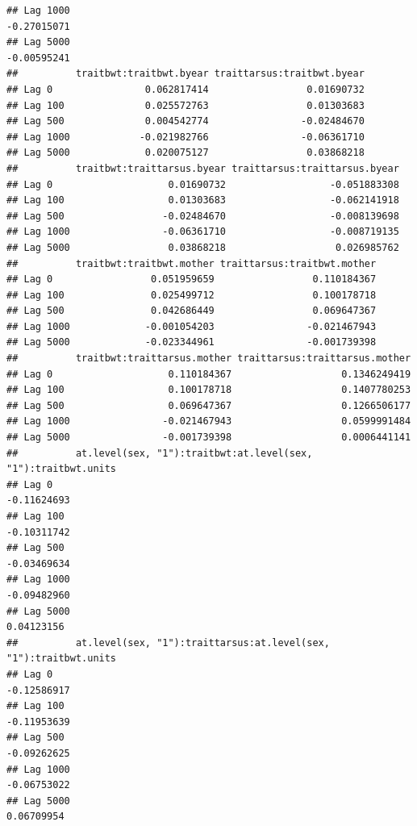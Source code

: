 \documentclass[
  12pt,
]{book}
\begin{document}
\begin{verbatim}
## Lag 1000                                                          -0.27015071
## Lag 5000                                                          -0.00595241
##          traitbwt:traitbwt.byear traittarsus:traitbwt.byear
## Lag 0                0.062817414                 0.01690732
## Lag 100              0.025572763                 0.01303683
## Lag 500              0.004542774                -0.02484670
## Lag 1000            -0.021982766                -0.06361710
## Lag 5000             0.020075127                 0.03868218
##          traitbwt:traittarsus.byear traittarsus:traittarsus.byear
## Lag 0                    0.01690732                  -0.051883308
## Lag 100                  0.01303683                  -0.062141918
## Lag 500                 -0.02484670                  -0.008139698
## Lag 1000                -0.06361710                  -0.008719135
## Lag 5000                 0.03868218                   0.026985762
##          traitbwt:traitbwt.mother traittarsus:traitbwt.mother
## Lag 0                 0.051959659                 0.110184367
## Lag 100               0.025499712                 0.100178718
## Lag 500               0.042686449                 0.069647367
## Lag 1000             -0.001054203                -0.021467943
## Lag 5000             -0.023344961                -0.001739398
##          traitbwt:traittarsus.mother traittarsus:traittarsus.mother
## Lag 0                    0.110184367                   0.1346249419
## Lag 100                  0.100178718                   0.1407780253
## Lag 500                  0.069647367                   0.1266506177
## Lag 1000                -0.021467943                   0.0599991484
## Lag 5000                -0.001739398                   0.0006441141
##          at.level(sex, "1"):traitbwt:at.level(sex, "1"):traitbwt.units
## Lag 0                                                      -0.11624693
## Lag 100                                                    -0.10311742
## Lag 500                                                    -0.03469634
## Lag 1000                                                   -0.09482960
## Lag 5000                                                    0.04123156
##          at.level(sex, "1"):traittarsus:at.level(sex, "1"):traitbwt.units
## Lag 0                                                         -0.12586917
## Lag 100                                                       -0.11953639
## Lag 500                                                       -0.09262625
## Lag 1000                                                      -0.06753022
## Lag 5000                                                       0.06709954

\end{verbatim}
\end{document}
